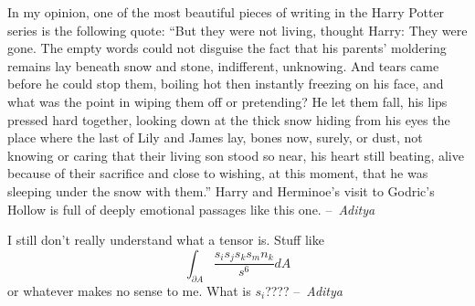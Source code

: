 \documentclass[12pt]{article}
\begin{document}
\begin{center}
\vspace{1cm}

In my opinion, one of the most beautiful pieces of writing in the Harry Potter series is the following quote: ``But they were not living, thought Harry: They were gone. The empty words could not disguise the fact that his parents' moldering remains lay beneath snow and stone, indifferent, unknowing. And tears came before he could stop them, boiling hot then instantly freezing on his face, and what was the point in wiping them off or pretending? He let them fall, his lips pressed hard together, looking down at the thick snow hiding from his eyes the place where the last of Lily and James lay, bones now, surely, or dust, not knowing or caring that their living son stood so near, his heart still beating, alive because of their sacrifice and close to wishing, at this moment, that he was sleeping under the snow with them.'' Harry and Herminoe's visit to Godric's Hollow is full of deeply emotional passages like this one. --~\textit{Aditya}

\vspace{1cm}

I still don't really understand what a tensor is. Stuff like $$\int_{\partial A} \frac{s_i s_j s_k s_m n_k}{s^6} dA$$ or whatever makes no sense to me. What is $s_i$???? --~\textit{Aditya}

\vspace{1cm}

\end{center}
\end{document}
